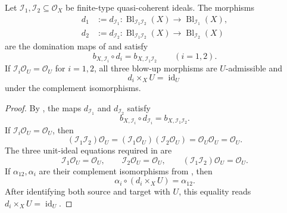 \begin{lemma}
  \label{lemma:nagata-product-ideal-common-blowup}
  \lean{}

  Let $\mathcal I_1,\mathcal I_2\subseteq\mathcal O_X$ be finite-type
  quasi-coherent ideals.  The morphisms
  \[
  \begin{aligned}
    d_1&:=d_{\mathcal I_1}\colon
      \operatorname{Bl}_{\mathcal I_1\mathcal I_2}(X)
        \longrightarrow\operatorname{Bl}_{\mathcal I_1}(X),\\
    d_2&:=d_{\mathcal I_2}\colon
      \operatorname{Bl}_{\mathcal I_1\mathcal I_2}(X)
        \longrightarrow\operatorname{Bl}_{\mathcal I_2}(X)
  \end{aligned}
  \]
  are the domination maps of
   and satisfy
  \[
    b_{X,\mathcal I_i}\circ d_i=b_{X,\mathcal I_1\mathcal I_2}
      \qquad(i=1,2).
  \]
  If $\mathcal I_i\mathcal O_U=\mathcal O_U$ for $i=1,2$, all three
  blow-up morphisms are $U$-admissible and
  \[
    d_i\times_XU=\operatorname{id}_U
  \]
  under the complement isomorphisms.
\end{lemma}

\begin{proof}
  By , the maps
  $d_{\mathcal I_1}$ and $d_{\mathcal I_2}$ satisfy
  \[
    b_{X,\mathcal I_i}\circ d_{\mathcal I_i}
      =b_{X,\mathcal I_1\mathcal I_2}.
  \]
  If $\mathcal I_i\mathcal O_U=\mathcal O_U$, then
  \[
    (\mathcal I_1\mathcal I_2)\mathcal O_U
      =(\mathcal I_1\mathcal O_U)(\mathcal I_2\mathcal O_U)
      =\mathcal O_U\mathcal O_U=\mathcal O_U.
  \]
  The three unit-ideal equations required in
   are
  \[
    \mathcal I_1\mathcal O_U=\mathcal O_U,\qquad
    \mathcal I_2\mathcal O_U=\mathcal O_U,\qquad
    (\mathcal I_1\mathcal I_2)\mathcal O_U=\mathcal O_U.
  \]
  If
  $\alpha_{12},\alpha_i$ are their complement isomorphisms from
  , then
  \[
    \alpha_i\circ(d_i\times_XU)
      =\alpha_{12}.
  \]
  After identifying both source and target with $U$, this equality reads
  $d_i\times_XU=\operatorname{id}_U$.
\end{proof}

